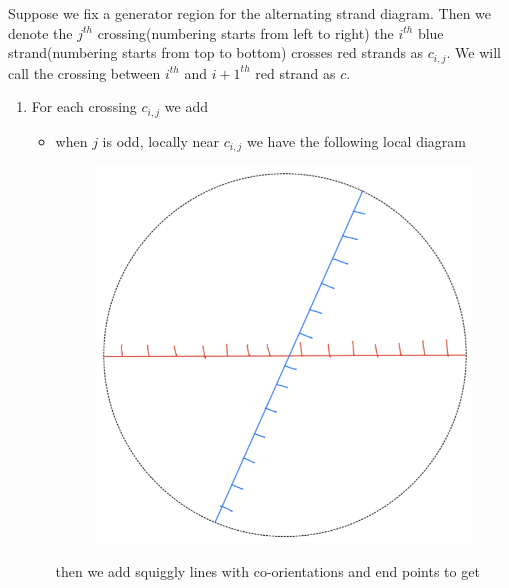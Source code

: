 \begin{definition}
Suppose we fix a generator region for the alternating strand diagram. Then we denote the $j^{th}$ crossing(numbering starts from left to right) the $i^{th}$ blue strand(numbering starts from top to bottom) crosses red strands as $c_{i,j}$. We will call the crossing between $i^{th}$ and $i+1^{th}$ red strand as $c$.
\begin{enumerate}[label = (\roman*)]
\item For each crossing $c_{i,j}$ we add 
\begin{itemize}
\item when $j$ is odd, locally near $c_{i,j}$ we have the following local diagram
\begin{figure}[H] 
    \centering
    \includegraphics[scale = 0.55]{diagrams/local_systems_on_as_diagrams/3.png} 
    \caption{}
    \label{fig:your-label}
\end{figure}
then we add squiggly lines with co-orientations and end points to get
\begin{figure}[H] 
    \centering

\end{figure}
\end{itemize}
\end{enumerate}
\end{definition}
